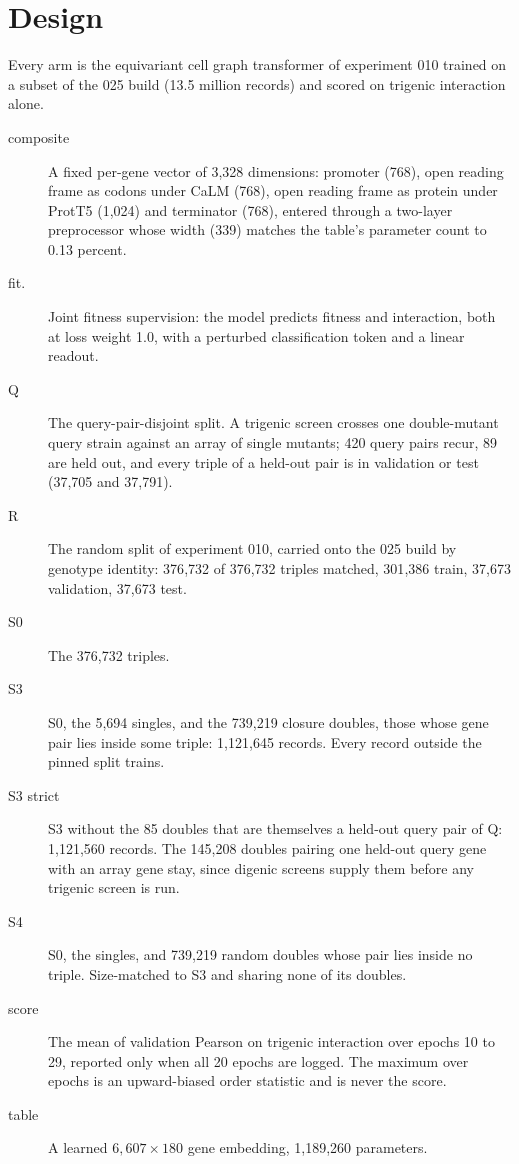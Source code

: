 \section{Design}
\label{sec:design}

Every arm is the equivariant cell graph transformer of experiment 010 trained on a subset
of the 025 build (13.5 million records) and scored on trigenic interaction alone.

\begin{description}
\item[composite] A fixed per-gene vector of 3{,}328 dimensions: promoter (768), open
  reading frame as codons under CaLM (768), open reading frame as protein under ProtT5
  (1{,}024) and terminator (768), entered through a two-layer preprocessor whose width
  (339) matches the table's parameter count to 0.13 percent.
\item[fit.] Joint fitness supervision: the model predicts fitness and interaction, both
  at loss weight 1.0, with a perturbed classification token and a linear readout.
\item[Q] The query-pair-disjoint split. A trigenic screen crosses one double-mutant query
  strain against an array of single mutants; 420 query pairs recur, 89 are held out, and
  every triple of a held-out pair is in validation or test (37{,}705 and 37{,}791).
\item[R] The random split of experiment 010, carried onto the 025 build by genotype
  identity: 376{,}732 of 376{,}732 triples matched, 301{,}386 train, 37{,}673 validation,
  37{,}673 test.
\item[S0] The 376{,}732 triples.
\item[S3] S0, the 5{,}694 singles, and the 739{,}219 closure doubles, those whose gene pair
  lies inside some triple: 1{,}121{,}645 records. Every record outside the pinned split
  trains.
\item[S3 strict] S3 without the 85 doubles that are themselves a held-out query pair of
  Q: 1{,}121{,}560 records. The 145{,}208 doubles pairing one held-out query gene with an
  array gene stay, since digenic screens supply them before any trigenic screen is run.
\item[S4] S0, the singles, and 739{,}219 random doubles whose pair lies inside no triple.
  Size-matched to S3 and sharing none of its doubles.
\item[score] The mean of validation Pearson on trigenic interaction over epochs 10 to 29,
  reported only when all 20 epochs are logged. The maximum over epochs is an upward-biased
  order statistic and is never the score.
\item[table] A learned $6{,}607 \times 180$ gene embedding, 1{,}189{,}260 parameters.
\end{description}

